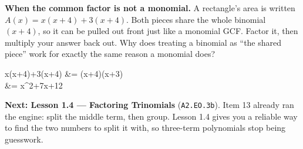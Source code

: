\documentclass[10pt]{article}
\begin{document}
\vspace{0.10in}

\boxguard[18]
\begin{extensionbox}
\small
\textbf{When the common factor is not a monomial.} A rectangle's area is written
$A(x) = x(x+4)+3(x+4)$. Both pieces share the whole binomial $(x+4)$, so it can be pulled out front
just like a monomial GCF. Factor it, then multiply your answer back out. Why does treating a
binomial as ``the shared piece'' work for exactly the same reason a monomial does?
\begin{work}
  x(x+4)+3(x+4) &= (x+4)(x+3) \\
                &= x^2+7x+12 \quad\checkmark
\end{work}
\writeline
\end{extensionbox}

\vspace{0.10in}

\begin{remindbox}
\small
\textbf{Next: Lesson 1.4 --- Factoring Trinomials} (\texttt{A2.EO.3b}). Item 13 already ran the
engine: split the middle term, then group. Lesson 1.4 gives you a reliable way to find the two
numbers to split it with, so three-term polynomials stop being guesswork.
\end{remindbox}
\end{document}
